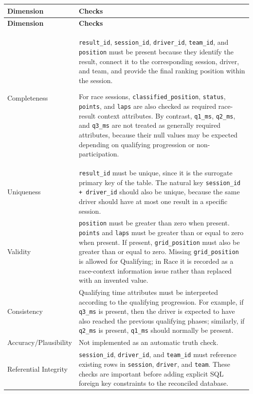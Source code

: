 \documentclass[a4paper,11pt]{article}
\begin{document}
	\begin{longtable}{p{3.5cm}p{11cm}}
		\toprule
		\textbf{Dimension} & \textbf{Checks} \\
		\midrule
		\endfirsthead
		
		\toprule
		\textbf{Dimension} & \textbf{Checks} \\
		\midrule
		\endhead
		
		Completeness
		& \texttt{result\_id}, \texttt{session\_id}, \texttt{driver\_id},
		\texttt{team\_id}, and \texttt{position} must be present because they
		identify the result, connect it to the corresponding session, driver, and
		team, and provide the final ranking position within the session.
		
		For race sessions, \texttt{classified\_position}, \texttt{status},
		\texttt{points}, and \texttt{laps} are also checked as required
		race-result context attributes. By contrast, \texttt{q1\_ms},
		\texttt{q2\_ms}, and \texttt{q3\_ms} are not treated as generally required
		attributes, because their null values may be expected depending on qualifying
		progression or non-participation. \\
		\midrule
		
		Uniqueness
		& \texttt{result\_id} must be unique, since it is the surrogate primary key
		of the table. The natural key \texttt{session\_id + driver\_id} should also
		be unique, because the same driver should have at most one result in a
		specific session. \\
		\midrule
		
		Validity
		& \texttt{position} must be greater than zero when present.
		\texttt{points} and \texttt{laps} must be greater than or equal to zero
		when present. If present, \texttt{grid\_position} must also be greater than
		or equal to zero. Missing \texttt{grid\_position} is allowed for Qualifying;
		in Race it is recorded as a race-context information issue rather than replaced
		with an invented value. \\
		\midrule
		
		Consistency
		& Qualifying time attributes must be interpreted according to the qualifying
		progression. For example, if \texttt{q3\_ms} is present, then the driver is
		expected to have also reached the previous qualifying phases; similarly, if
		\texttt{q2\_ms} is present, \texttt{q1\_ms} should normally be present. \\
		\midrule
		
		Accuracy/Plausibility
		& Not implemented as an automatic truth check. \\
		\midrule
		
		Referential Integrity
		& \texttt{session\_id}, \texttt{driver\_id}, and \texttt{team\_id} must
		reference existing rows in \texttt{session}, \texttt{driver}, and
		\texttt{team}. These checks are important before adding explicit SQL foreign
		key constraints to the reconciled database. \\
		\bottomrule
	\end{longtable}
	
\end{document}
